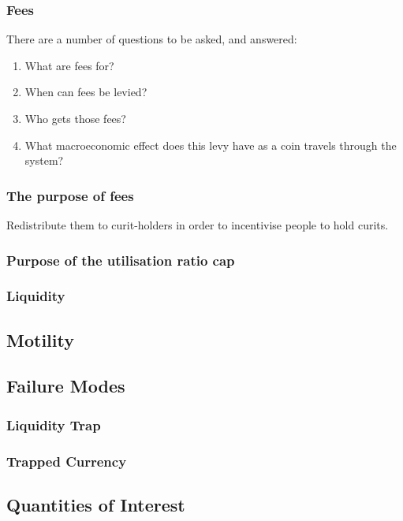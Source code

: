 \documentclass{article}
\begin{document}
\subsubsection{Fees}
There are a number of questions to be asked, and answered:
\begin{enumerate}
    \item What are fees for?
    \item When can fees be levied?
    \item Who gets those fees?
    \item What macroeconomic effect does this levy have as a coin travels through the system?
\end{enumerate}

\subsubsection{The purpose of fees}
Redistribute them to curit-holders in order to incentivise people to hold curits.

\subsubsection{Purpose of the utilisation ratio cap}


\subsubsection{Liquidity}
\hfill

\subsection{Motility}

\subsection{Failure Modes}

\subsubsection{Liquidity Trap}
\subsubsection{Trapped Currency}

\subsection{Quantities of Interest}
\end{document}
